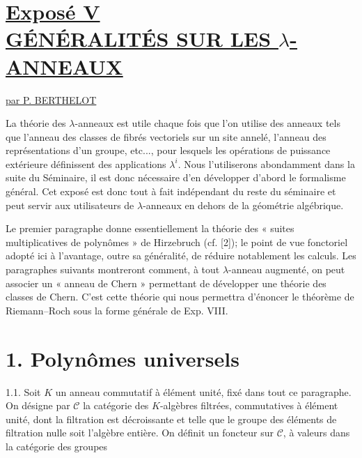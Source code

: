 
\renewcommand{\parf}{\operatorname{parf}}
\section*{\underline{Exposé V}\\[3pt] \underline{\underline{GÉNÉRALITÉS SUR LES \(\lambda\)-ANNEAUX}}}
\begin{center}
\underline{par P. BERTHELOT}
\end{center}

La théorie des \(\lambda\)-anneaux est utile chaque fois que l'on utilise des anneaux tels que l'anneau des classes de fibrés vectoriels sur un site annelé, l'anneau des représentations d'un groupe, etc..., pour lesquels les opérations de puissance extérieure définissent des applications \(\lambda^i\). Nous l'utiliserons abondamment dans la suite du Séminaire, il est donc nécessaire d'en développer d'abord le formalisme général. Cet exposé est donc tout à fait indépendant du reste du séminaire et peut servir aux utilisateurs de \(\lambda\)-anneaux en dehors de la géométrie algébrique.

Le premier paragraphe donne essentiellement la théorie des « suites multiplicatives de polynômes » de Hirzebruch (cf. [2]); le point de vue fonctoriel adopté ici à l'avantage, outre sa généralité, de réduire notablement les calculs. Les paragraphes suivants montreront comment, à tout \(\lambda\)-anneau augmenté, on peut associer un « anneau de Chern » permettant de développer une théorie des classes de Chern. C'est cette théorie qui nous permettra d'énoncer le théorème de Riemann--Roch sous la forme générale de Exp. VIII.

\section*{1. Polynômes universels}

1.1. Soit \(K\) un anneau commutatif à élément unité, fixé dans tout ce paragraphe. On désigne par \(\mathcal C\) la catégorie des \(K\)-algèbres filtrées, commutatives à élément unité, dont la filtration est décroissante et telle que le groupe des éléments de filtration nulle soit l'algèbre entière. On définit un foncteur sur \(\mathcal C\), à valeurs dans la catégorie des groupes 
